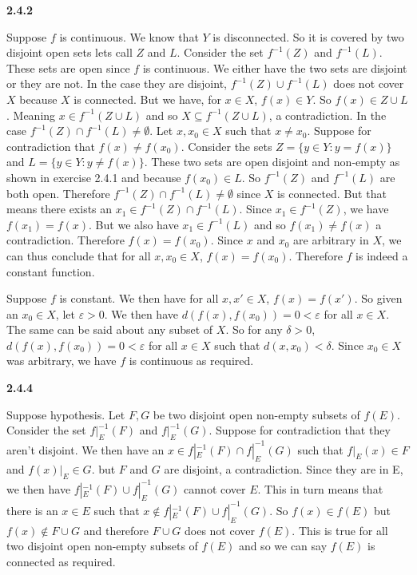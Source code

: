 \documentclass[12pt]{article}
\begin{document}
\textbf{2.4.2}

Suppose $f$ is continuous. We know that $Y$ is disconnected. So it is covered by two disjoint open sets lets call $Z$ and $L$. Consider the set $f^{-1}(Z)$ and $f^{-1}(L)$. These sets are open since $f$ is continuous. We either have the two sets are disjoint or they are not. In the case they are disjoint, $f^{-1}(Z)\cup f^{-1}(L)$ does not cover $X$ because $X$ is connected. But we have, for $x\in X$, $f(x) \in Y$. So $f(x)\in Z\cup L$. Meaning $x\in f^{-1}(Z\cup L)$ and so $X\subseteq f^{-1}(Z\cup L)$, a contradiction. In the case $f^{-1}(Z)\cap f^{-1}(L)\neq \emptyset$. Let $x,x_0\in X$ such that $x\neq x_0$. Suppose for contradiction that $f(x) \neq f(x_0)$. Consider the sets $Z = \{y\in Y: y=f(x)\}$ and $L = \{y\in Y: y\neq f(x)\}$. These two sets are open disjoint and non-empty as shown in exercise 2.4.1 and because $f(x_0) \in L$. So $ f^{-1}(Z)$ and $f^{-1}(L)$ are both open. Therefore $f^{-1}(Z)\cap f^{-1}(L)\neq \emptyset$ since $X$ is connected. But that means there exists an $x_1\in f^{-1}(Z)\cap f^{-1}(L)$. Since $x_1\in f^{-1}(Z)$, we have $f(x_1)=f(x)$. But we also have $x_1\in f^{-1}(L)$ and so $f(x_1) \neq f(x)$ a contradiction. Therefore $f(x) = f(x_0)$. Since $x$ and $x_0$ are arbitrary in $X$, we can thus conclude that for all $x,x_0\in X$, $f(x) = f(x_0)$. Therefore $f$ is indeed a constant function.

Suppose $f$ is constant. We then have for all $x,x'\in X$, $f(x) = f(x')$. So given an $x_0\in X$, let $\varepsilon>0$. We then have $ d(f(x), f(x_0) ) = 0 < \varepsilon$ for all $x\in X$. The same can be said about any subset of $X$. So for any $\delta >0$, $d(f(x), f(x_0) ) = 0 < \varepsilon$ for all $x\in X$ such that $d(x,x_0) < \delta$. Since $x_0\in X$ was arbitrary, we have $f$ is continuous as required.  

\textbf{2.4.4}

Suppose hypothesis. Let $F,G$ be two disjoint open non-empty subsets of $f(E)$. Consider the set $ f|_E^{-1}(F)$ and $f|_E^{-1}(G)$. Suppose for contradiction that they aren't disjoint. We then have an $x\in f|_E^{-1}(F)\cap f|_E^{-1}(G)$ such that $f|_E(x) \in F$ and $f(x)|_E\in G$. but $F$ and $G$ are disjoint, a contradiction. Since they are in E, we then have $f|_E^{-1}(F)\cup f|_E^{-1}(G)$ cannot cover $E$. This in turn means that there is an $x\in E$ such that $x\notin f|_E^{-1}(F)\cup f|_E^{-1}(G)$. So $f(x) \in f(E)$ but $f(x)\notin F\cup G$ and therefore $F\cup G$ does not cover $f(E)$. This is true for all two disjoint open non-empty subsets of $f(E)$ and so we can say $f(E)$ is connected as required. 
\end{document}
